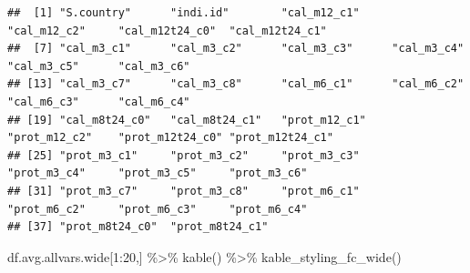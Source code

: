 \documentclass[
]{book}
\newenvironment{Shaded}{\begin{snugshade}}{\end{snugshade}}
\newcommand{\DecValTok}[1]{\textcolor[rgb]{0.00,0.00,0.81}{#1}}
\newcommand{\FunctionTok}[1]{\textcolor[rgb]{0.00,0.00,0.00}{#1}}
\newcommand{\NormalTok}[1]{#1}
\newcommand{\SpecialCharTok}[1]{\textcolor[rgb]{0.00,0.00,0.00}{#1}}
\begin{document}
\begin{verbatim}
##  [1] "S.country"      "indi.id"        "cal_m12_c1"     "cal_m12_c2"     "cal_m12t24_c0"  "cal_m12t24_c1" 
##  [7] "cal_m3_c1"      "cal_m3_c2"      "cal_m3_c3"      "cal_m3_c4"      "cal_m3_c5"      "cal_m3_c6"     
## [13] "cal_m3_c7"      "cal_m3_c8"      "cal_m6_c1"      "cal_m6_c2"      "cal_m6_c3"      "cal_m6_c4"     
## [19] "cal_m8t24_c0"   "cal_m8t24_c1"   "prot_m12_c1"    "prot_m12_c2"    "prot_m12t24_c0" "prot_m12t24_c1"
## [25] "prot_m3_c1"     "prot_m3_c2"     "prot_m3_c3"     "prot_m3_c4"     "prot_m3_c5"     "prot_m3_c6"    
## [31] "prot_m3_c7"     "prot_m3_c8"     "prot_m6_c1"     "prot_m6_c2"     "prot_m6_c3"     "prot_m6_c4"    
## [37] "prot_m8t24_c0"  "prot_m8t24_c1"
\end{verbatim}

\begin{Shaded}
\begin{Highlighting}[]
\NormalTok{df.avg.allvars.wide[}\DecValTok{1}\SpecialCharTok{:}\DecValTok{20}\NormalTok{,] }\SpecialCharTok{\%\textgreater{}\%} \FunctionTok{kable}\NormalTok{() }\SpecialCharTok{\%\textgreater{}\%} \FunctionTok{kable\_styling\_fc\_wide}\NormalTok{()}
\end{Highlighting}
\end{Shaded}
\end{document}
